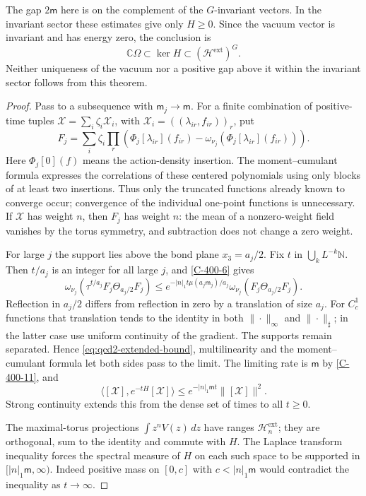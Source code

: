 \documentclass[11pt,letterpaper,reqno]{amsart}
\theoremstyle{definition}
\theoremstyle{remark}
\begin{document}
The gap $2\mathsf m$ here is on the complement of the
$G$-invariant vectors. In the invariant sector these
estimates give only $H\ge0$. Since the vacuum vector
is invariant and has energy zero, the conclusion is
\[
 \mathbb C\Omega\subset\ker H
                     \subset(\mathcal H^{\mathrm{ext}})^G.
\]
Neither uniqueness of the vacuum nor a positive gap
above it within the invariant sector follows from
this theorem.


\begin{proof}
Pass to a subsequence with $\mathsf m_j\to\mathsf m$.
For a finite combination of positive-time tuples
$\mathcal X=\sum_i\zeta_i\mathcal X_i$, with
$\mathcal X_i=((\lambda_{ir},f_{ir}))_r$, put
\[
 F_j=\sum_i\zeta_i\prod_r
     \left(\Phi_j[\lambda_{ir}](f_{ir})
                 -\omega_{\nu_j}(\Phi_j[\lambda_{ir}](f_{ir}))\right).
\]
Here $\Phi_j[0](f)$ means the action-density insertion.
The moment--cumulant formula expresses the correlations
of these centered polynomials using only blocks of at
least two insertions. Thus only the truncated functions
already known to converge occur; convergence of the
individual one-point functions is unnecessary.
If $\mathcal X$ has weight $n$, then $F_j$ has
weight $n$: the mean of a nonzero-weight field
vanishes by the torus symmetry, and subtraction
does not change a zero weight.

For large $j$ the support lies above the bond plane
$x_3=a_j/2$. Fix $t$ in $\bigcup_kL^{-k}\mathbb N$.
Then $t/a_j$ is an integer for all large $j$, and
\cref{C-400-6} gives
\[
 \omega_{\nu_j}(\tau^{t/a_j}F_j\Theta_{a_j/2}F_j)
 \le e^{-|n|_1t\mu(a_j\mathsf m_j)/a_j}
                 \omega_{\nu_j}(F_j\Theta_{a_j/2}F_j).
\]
Reflection in $a_j/2$ differs from reflection in zero
by a translation of size $a_j$. For $C_c^1$ functions
that translation tends to the identity in both
$\|\cdot\|_\infty$ and $\|\cdot\|_\sharp$;
in the latter case use uniform continuity of the
gradient. The supports remain separated. Hence
\eqref{eq:qcd2-extended-bound}, multilinearity and
the moment--cumulant formula let both sides pass
to the limit. The limiting rate is $\mathsf m$
by \cref{C-400-11}, and
\[
 \langle[\mathcal X],e^{-tH}[\mathcal X]\rangle
       \le e^{-|n|_1\mathsf mt}\|[\mathcal X]\|^2.
\]
Strong continuity extends this from the dense set
of times to all $t\ge0$.

The maximal-torus projections
$\int z^nV(z)\,dz$ have ranges
$\mathcal H_n^{\mathrm{ext}}$; they are orthogonal,
sum to the identity and commute with $H$.
The Laplace transform inequality forces the
spectral measure of $H$ on each such space to
be supported in $[|n|_1\mathsf m,\infty)$.
Indeed positive mass on $[0,c]$ with
$c<|n|_1\mathsf m$ would contradict the inequality
as $t\to\infty$.


\end{proof}
\end{document}
